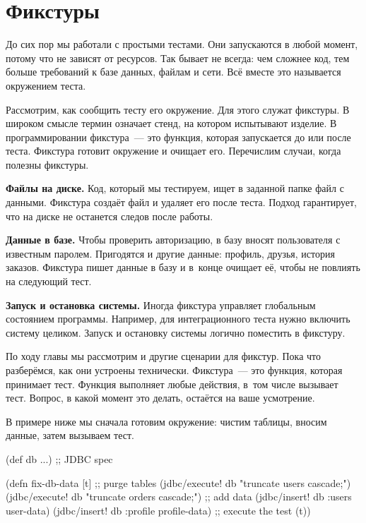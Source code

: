 \fi

\section{Фикстуры}


До сих пор мы работали с простыми тестами. Они запускаются в любой момент,
потому что не зависят от ресурсов. Так бывает не всегда: чем сложнее код, тем
больше требований к базе данных, файлам и сети. Всё вместе это называется
окружением теста.

Рассмотрим, как сообщить тесту его окружение. Для этого служат фикстуры. В
широком смысле термин означает стенд, на котором испытывают изделие. В
программировании фикстура~--- это функция, которая запускается до или после
теста. Фикстура готовит окружение и очищает его. Перечислим случаи, когда
полезны фикстуры.


\textbf{Файлы на диске.} Код, который мы тестируем, ищет в заданной папке файл с
данными. Фикстура создаёт файл и удаляет его после теста. Подход гарантирует,
что на диске не останется следов после работы.

\textbf{Данные в базе.} Чтобы проверить авторизацию, в базу вносят пользователя
с известным паролем. Пригодятся и другие данные: профиль, друзья, история
заказов. Фикстура пишет данные в базу и в~конце очищает её, чтобы не повлиять на
следующий тест.

\textbf{Запуск и остановка системы.} Иногда фикстура управляет глобальным
состоянием программы. Например, для интеграционного теста нужно включить систему
целиком. Запуск и остановку системы логично поместить в фикстуру.

По ходу главы мы рассмотрим и другие сценарии для фикстур. Пока что разберёмся,
как они устроены технически. Фикстура~--- это функция, которая принимает
тест. Функция выполняет любые действия, в~том числе вызывает тест. Вопрос, в
какой момент это делать, остаётся на ваше усмотрение.

В примере ниже мы сначала готовим окружение: чистим таблицы, вносим данные,
затем вызываем тест.


\ifx\DEVICETYPE\MOBILE

\begin{english}
  \begin{clojure}
(def db {...}) ;; JDBC spec

(defn fix-db-data [t]
  ;; purge tables
  (jdbc/execute! db
    "truncate users cascade;")
  (jdbc/execute! db
    "truncate orders cascade;")
  ;; add data
  (jdbc/insert! db :users user-data)
  (jdbc/insert! db
    :profile profile-data)
  ;; execute the test
  (t))
  \end{clojure}
\end{english}


